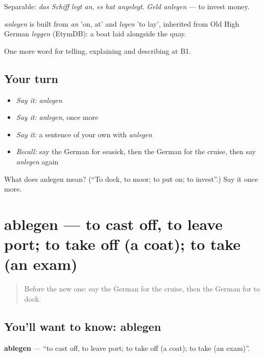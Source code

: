 Separable: \emph{das Schiff legt an}, \emph{es hat angelegt}. \emph{Geld anlegen} — to invest money.

\begin{cousinweb}
\emph{anlegen} is built from \emph{an} 'on, at' and \emph{legen} 'to lay', inherited from Old High German \emph{leggen} (EtymDB): a boat laid alongside the quay.
\end{cousinweb}

\begin{grammarlens}[title={What you've built}]
One more word for telling, explaining and describing at B1.
\end{grammarlens}

\subsection*{Your turn}
\begin{itemize}
\raggedright
  \item \emph{Say it:} \emph{anlegen}
  \item \emph{Say it:} \emph{anlegen}, once more
  \item \emph{Say it:} a sentence of your own with \emph{anlegen}
  \item \emph{Recall:} say the German for seasick, then the German for the cruise, then say \emph{anlegen} again
\end{itemize}

\begin{tcolorbox}[breakable,colback=teal!4,colframe=teal!35!black,title={Before you move on}]
What does anlegen mean? (\textquotedblleft{}To dock, to moor; to put on; to invest\textquotedblright{}.) Say it once more.
\end{tcolorbox}
\section[ablegen]{ablegen — to cast off, to leave port; to take off (a coat); to take (an exam)}

\label{lesson:GE-C422-ablegen}



\begin{quote}
Before the new one: say the German for the cruise, then the German for to dock.
\end{quote}

\subsection*{You'll want to know: ablegen}
\textbf{ablegen} — \textquotedblleft{}to cast off, to leave port; to take off (a coat); to take (an exam)\textquotedblright{}.

